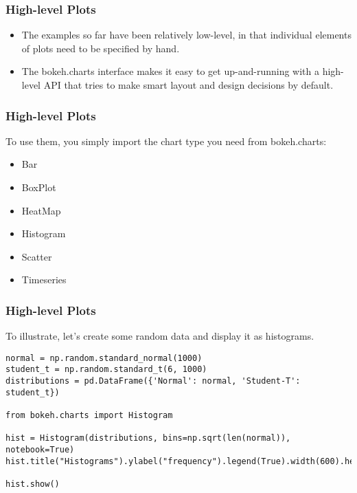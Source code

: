 \begin{frame}[fragile] \frametitle{High-level Plots}
\begin{itemize}
\item The examples so far have been relatively low-level, in that individual elements of plots need to be specified by hand. 
\item The bokeh.charts interface makes it easy to get up-and-running with a high-level API that tries to make smart layout and design decisions by default.
\end{itemize}
\end{frame}

\begin{frame}[fragile] \frametitle{High-level Plots}
To use them, you simply import the chart type you need from bokeh.charts:
\begin{itemize}
\item Bar
\item BoxPlot
\item HeatMap
\item Histogram
\item Scatter
\item Timeseries
\end{itemize}
\end{frame}

\begin{frame}[fragile] \frametitle{High-level Plots}
To illustrate, let's create some random data and display it as histograms.
\begin{lstlisting}
normal = np.random.standard_normal(1000)
student_t = np.random.standard_t(6, 1000)
distributions = pd.DataFrame({'Normal': normal, 'Student-T': student_t})

from bokeh.charts import Histogram

hist = Histogram(distributions, bins=np.sqrt(len(normal)), notebook=True)
hist.title("Histograms").ylabel("frequency").legend(True).width(600).height(300)

hist.show()
\end{lstlisting}
\end{frame}

